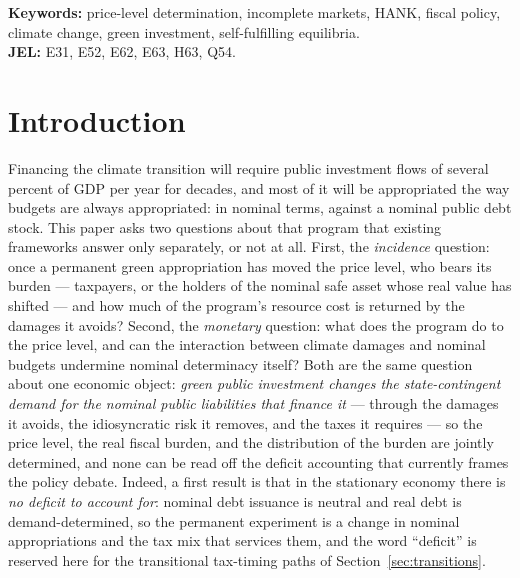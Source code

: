 \documentclass[12pt]{article}
\begin{document}
\bigskip
\noindent\textbf{Keywords:} price-level determination, incomplete markets,
HANK, fiscal policy, climate change, green investment, self-fulfilling
equilibria.\\
\textbf{JEL:} E31, E52, E62, E63, H63, Q54.

\newpage

\section{Introduction}\label{sec:intro}

Financing the climate transition will require public investment flows of
several percent of GDP per year for decades, and most of it will be
appropriated the way budgets are always appropriated: in nominal terms,
against a nominal public debt stock. This paper asks two questions about
that program that existing frameworks answer only separately, or not at all.
First, the \emph{incidence} question: once a permanent green appropriation has
moved the price level, who bears its burden --- taxpayers, or the holders of
the nominal safe asset whose real value has shifted --- and how much of the
program's resource cost is returned by the damages it avoids? Second, the
\emph{monetary} question: what does the program do to the price
level, and can the interaction between climate damages and nominal budgets
undermine nominal determinacy itself? Both are the same question about one
economic object: \emph{green public investment changes the state-contingent
demand for the nominal public liabilities that finance it} --- through the
damages it avoids, the idiosyncratic risk it removes, and the taxes it
requires --- so the price level, the real fiscal burden, and the
distribution of the burden are jointly determined, and none can be read off
the deficit accounting that currently frames the policy debate. Indeed, a
first result is that in the stationary economy there is \emph{no deficit to
account for}: nominal debt issuance is neutral and real debt is
demand-determined, so the permanent experiment is a change in nominal
appropriations and the tax mix that services them, and the word ``deficit''
is reserved here for the transitional tax-timing paths of
Section~\ref{sec:transitions}.
\end{document}
